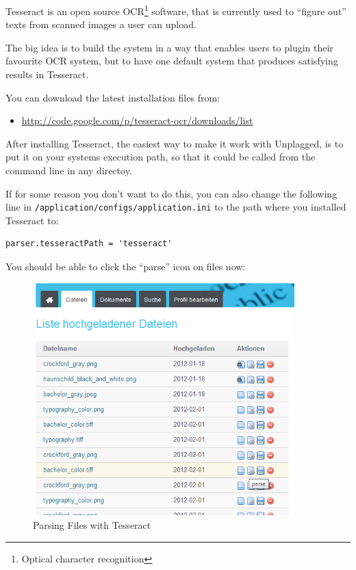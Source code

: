 Tesseract is an open source OCR\footnote{Optical character recognition} software, that is currently used to \enquote{figure out}
texts from scanned images a user can upload. 

The big idea is to build the system in a way that enables users to
plugin their favourite OCR system, but to have one default system that produces satisfying results in Tesseract.

You can download the latest installation files from:

\begin{itemize}
\item \url{http://code.google.com/p/tesseract-ocr/downloads/list}
\end{itemize}

After installing Tesseract, the easiest way to make it work with Unplagged, is to put it on your systems execution path,
so that it could be called from the command line in any directoy.

If for some reason you don't want to do this, you can also change the following line in 
\texttt{/application/configs/application.ini} to the path where you installed Tesseract to:

\begin{lstlisting}[caption=Tesseract executable path]
parser.tesseractPath = 'tesseract'
\end{lstlisting}

You should be able to click the \enquote{parse} icon on files now:

\begin{figure}[htbp]
  \centering
    \includegraphics[width=0.9\textwidth]{images/parse-button.png}
  \caption{Parsing Files with Tesseract}
  \label{fig:parseButton}
\end{figure}

